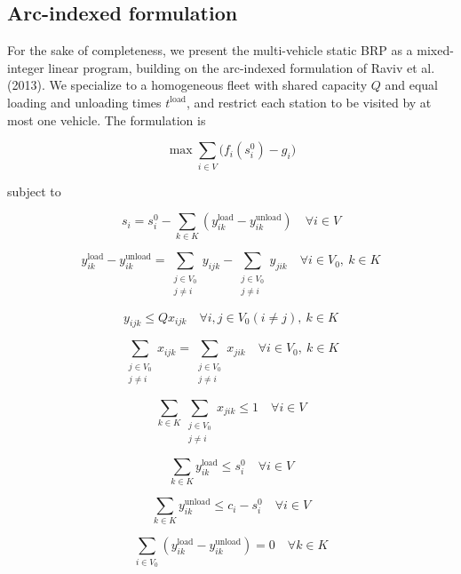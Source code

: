 \documentclass[11pt]{article}
\numberwithin{table}{section}
\numberwithin{figure}{section}
\begin{document}
\subsection{Arc-indexed formulation}

For the sake of completeness, we present the multi-vehicle static BRP as a mixed-integer linear program, building on the arc-indexed formulation of Raviv et al. (2013). We specialize to a homogeneous fleet with shared capacity $Q$ and equal loading and unloading times $t^{\text{load}}$, and restrict each station to be visited by at most one vehicle. The formulation is

\[
\max \sum_{i \in V} \bigl( f_i(s_i^0) - g_i \bigr)
\]

subject to

\[
s_i = s_i^0 - \sum_{k \in K} (y_{ik}^{\text{load}} - y_{ik}^{\text{unload}}) \quad \forall i \in V
\]

\[
y_{ik}^{\text{load}}-y_{ik}^{\text{unload}}=\sum\limits_{\begin{smallmatrix}
j\in {{V}_{0}} \\
j\ne i
\end{smallmatrix}}{{{y}_{ijk}}}-\sum\limits_{\begin{smallmatrix}
j\in {{V}_{0}} \\
j\ne i
\end{smallmatrix}}{{{y}_{jik}}}\quad \forall i\in {{V}_{0}},\ k\in K
\]

\[
{{y}_{ijk}}\le Q{{x}_{ijk}}\quad \forall i,j\in {{V}_{0}}(i\ne j),\ k\in K
\]

\[
\sum\limits_{\begin{smallmatrix}
j\in {{V}_{0}} \\
j\ne i
\end{smallmatrix}}{{{x}_{ijk}}}=\sum\limits_{\begin{smallmatrix}
j\in {{V}_{0}} \\
j\ne i
\end{smallmatrix}}{{{x}_{jik}}}\quad \forall i\in {{V}_{0}},\ k\in K
\]

\[
\sum_{k \in K} \sum_{\substack{j \in V_0 \\ j \neq i}} x_{jik} \leq 1 \quad \forall i \in V
\]

\[
\sum_{k \in K} y_{ik}^{\text{load}} \leq s_i^0 \quad \forall i \in V
\]

\[
\sum\limits_{k\in K}{y_{ik}^{\text{unload}}}\le {{c}_{i}}-s_{i}^{0}\quad \forall i\in V
\]

\[
\sum_{i \in V_0} (y_{ik}^{\text{load}} - y_{ik}^{\text{unload}}) = 0 \quad \forall k \in K
\]
\end{document}
